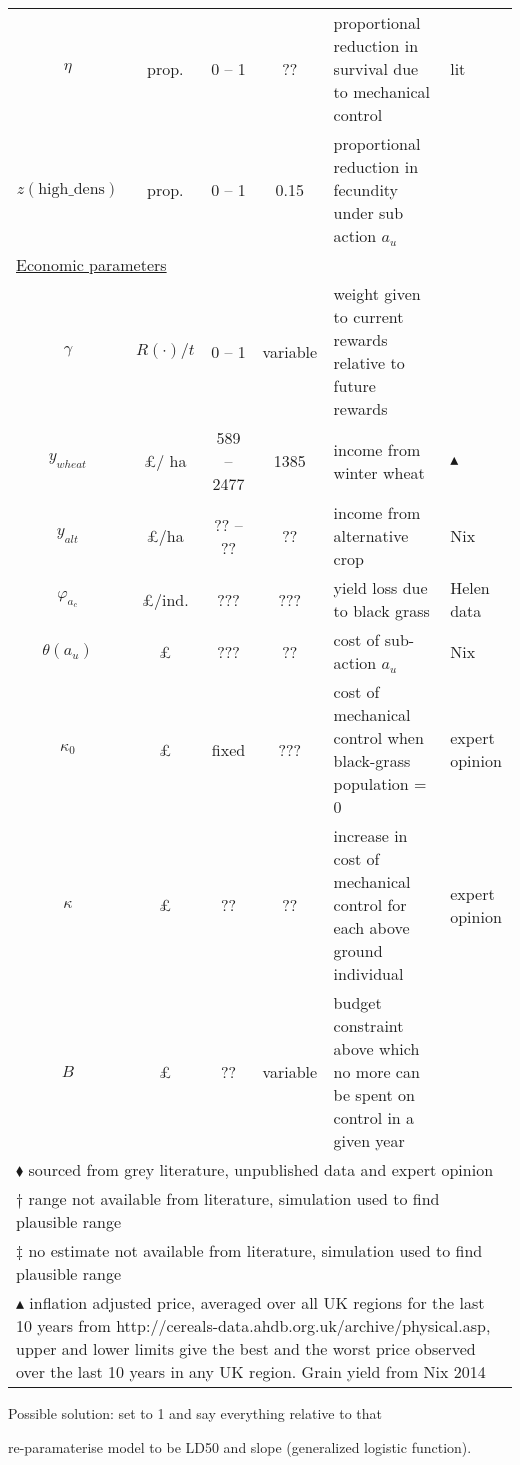 \documentclass[12pt, a4paper]{article}
\begin{document}
\begin{longtable}[h]{c c c c p{3.5cm} p{3cm}}
	$\eta$ & prop. & 0 -- 1 & ?? & proportional reduction in survival due to mechanical control & lit \\
	$z(\text{high\_dens})$ & prop. & 0 -- 1 & 0.15 & proportional reduction in fecundity under sub action $a_u$\\       	
	\multicolumn{6}{l}{\underline{Economic parameters}}\\
	$\gamma$ & $R(\cdot) / t$ & 0 -- 1 & variable & weight given to current rewards relative to future rewards &\\
	$y_{wheat}$ & \pounds / ha & 589 -- 2477 & 1385 & income from winter wheat & $\blacktriangle$\\
	$y_{alt}$ & \pounds/ha & ?? -- ?? & ?? & income from alternative crop & Nix\\
	$\varphi_{a_c}$ & \pounds/ind. & ??? & ??? & yield loss due to black grass & Helen data\\
	$\theta(a_u)$ & \pounds & ??? & ?? & cost of sub-action $a_u$ & Nix\\
	$\kappa_0$ & \pounds & fixed & ??? & cost of mechanical control when black-grass population = 0 & expert opinion \\
	$\kappa$ & \pounds & ?? & ?? & increase in cost of mechanical control for each above ground individual & expert opinion\\
	$B$ & \pounds & ?? & variable & budget constraint above which no more can be spent on control in a given year &\\    
	\hline
	\multicolumn{6}{l}{$\blacklozenge$ sourced from grey literature, unpublished data and expert opinion}\\
	\multicolumn{6}{l}{$\dag$ range not available from literature, simulation used to find plausible range}\\
	\multicolumn{6}{l}{$\ddag$ no estimate not available from literature, simulation used to find plausible
	 range}\\
	\multicolumn{6}{l}{\parbox{16cm}{$\blacktriangle$ inflation adjusted price, averaged over all UK regions for the last 10 years from http://cereals-data.ahdb.org.uk/archive/physical.asp, upper and lower limits give the best and the worst price observed over the last 10 years in any UK region. Grain yield from Nix 2014}}\\
	 
\end{longtable}

Possible solution:
set to 1 and say everything relative to that 

re-paramaterise model to be LD50 and slope (generalized logistic function).
\end{document}
